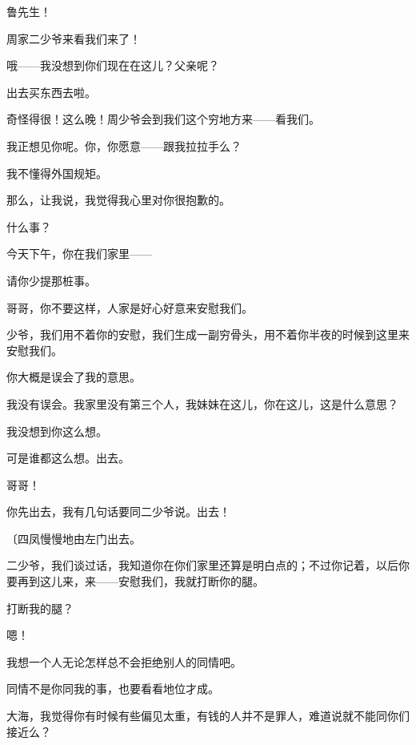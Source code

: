 鲁先生！

周家二少爷来看我们来了！

哦——我没想到你们现在在这儿？父亲呢？

出去买东西去啦。

奇怪得很！这么晚！周少爷会到我们这个穷地方来——看我们。

我正想见你呢。你，你愿意——跟我拉拉手么？

我不懂得外国规矩。

那么，让我说，我觉得我心里对你很抱歉的。

什么事？

今天下午，你在我们家里——

请你少提那桩事。

哥哥，你不要这样，人家是好心好意来安慰我们。

少爷，我们用不着你的安慰，我们生成一副穷骨头，用不着你半夜的时候到这里来安慰我们。

你大概是误会了我的意思。

我没有误会。我家里没有第三个人，我妹妹在这儿，你在这儿，这是什么意思？

我没想到你这么想。

可是谁都这么想。出去。

哥哥！

你先出去，我有几句话要同二少爷说。出去！

{\fangsong〔四凤慢慢地由左门出去。}

二少爷，我们谈过话，我知道你在你们家里还算是明白点的；不过你记着，以后你要再到这儿来，来——安慰我们，我就打断你的腿。

打断我的腿？

嗯！

我想一个人无论怎样总不会拒绝别人的同情吧。

同情不是你同我的事，也要看看地位才成。

大海，我觉得你有时候有些偏见太重，有钱的人并不是罪人，难道说就不能同你们接近么？

